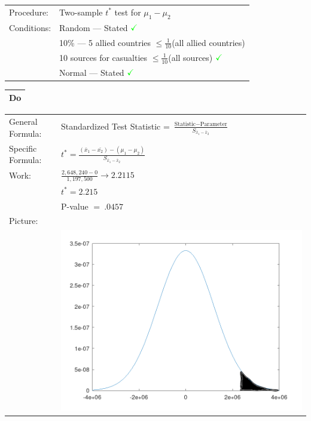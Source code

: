 \documentclass[12pt]{article}
\begin{document}
\begin{enumerate}
        \begin{tabular}{l l}

          Procedure: & Two-sample $t^*$ test for $\mu_1-\mu_2$\\

          Conditions: & Random — Stated $\textcolor{green}{\checkmark}$\\
          & 10\% — 5 allied countries $\leq \frac{1}{10}$(all allied countries)\\
          & \hspace{37.5pt} 10 sources for casualties $\leq \frac{1}{10}$(all sources) $\textcolor{green}{\checkmark}$\\
          & Normal — Stated $\textcolor{green}{\checkmark}$

        \end{tabular}

        \begin{flushleft}
          \begin{tabular}{|c|}
            \hline
            \textbf{Do}\\
            \hline
          \end{tabular}
        \end{flushleft}

        \begin{tabular}{l l}

          General Formula: & Standardized Test Statistic = $\frac{\text{Statistic} - \text{Parameter}}{S_{\bar{x}_1-\bar{x}_2}}$\\
          Specific Formula: & $t^*=\frac{(\bar{x}_1-\bar{x_2})-(\mu_1-\mu_2)}{S_{\bar{x}_1-\bar{x}_2}}$\\
          Work: & $\frac{2,648,240 - 0}{1,197,500}\longrightarrow2.2115$\\
          & $t^*=2.215$\\
          & P-value $=\ .0457$\\
          Picture: & \\
          & \includegraphics[width=.5\textwidth]{Prob1.png}


\end{tabular}
\end{enumerate}
\end{document}
